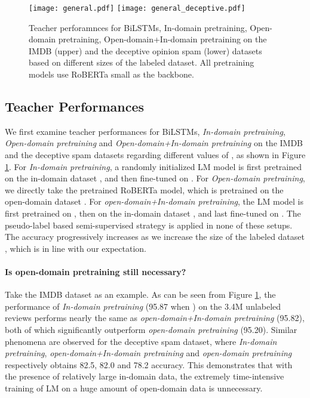 \documentclass[11pt,a4paper]{article}
\begin{document}
\begin{figure}[t]
  \centering
  \texttt{[image: general.pdf]}
    \texttt{[image: general\_deceptive.pdf]}
  \caption{Teacher perforamnces for BiLSTMs,   In-domain pretraining, 
  Open-domain pretraining, 
  Open-domain+In-domain pretraining  on the IMDB (upper) and the deceptive opinion spam (lower) datasets based on different sizes of the labeled dataset. All pretraining models use RoBERTa small as the backbone.  }
  \label{fig:general}
\end{figure}


\subsection{Teacher Performances}
We first examine  teacher performances
 for BiLSTMs,  {\it In-domain pretraining}, {\it Open-domain pretraining} and {\it Open-domain+In-domain  pretraining} 
on the IMDB and the deceptive  spam  datasets 
regarding different values of , as 
 shown in Figure \ref{fig:general}. 
For {\it In-domain pretraining}, a 
randomly initialized 
LM model is  first pretrained on the in-domain dataset , and then fine-tuned  on  .
For {\it Open-domain pretraining},
we  directly take the pretrained RoBERTa model, which is  pretrained on the open-domain dataset . 
For   {\it open-domain+In-domain  pretraining}, the LM model is first pretrained on  , then on the in-domain dataset , and last fine-tuned  on . 
The pseudo-label based semi-supervised strategy is  applied in none of these setups. 
The accuracy progressively increases 
as we increase the size of the labeled dataset , which is in line with our expectation. 


\paragraph{Is open-domain  pretraining still necessary?}
Take the IMDB dataset as an example. 
As can be seen from Figure \ref{fig:general}, 
the performance of {\it In-domain pretraining} 
(95.87 when )
on the 3.4M unlabeled reviews performs 
nearly 
 the same as {\it open-domain+In-domain  pretraining} (95.82), both of which significantly outperform 
{\it open-domain pretraining} (95.20). 
Similar phenomena are observed for the deceptive spam dataset, where
{\it In-domain pretraining},  {\it open-domain+In-domain  pretraining} and {\it open-domain pretraining} respectively 
obtains 82.5, 82.0 and 78.2 accuracy. 
This demonstrates that with the presence of relatively large in-domain data, the extremely time-intensive training of
 LM on a huge amount of open-domain data is unnecessary. 
\end{document}
